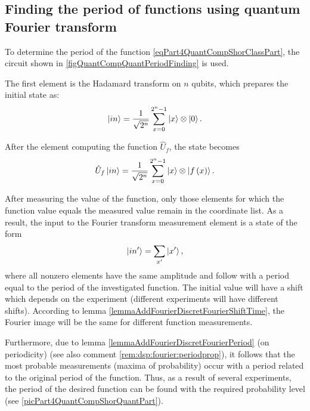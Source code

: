 \subsection{Finding the period of functions using quantum
  Fourier transform}

To determine the period of the function \eqref{eqPart4QuantCompShorClassPart},
the circuit shown in
\autoref{figQuantCompQuantPeriodFinding} is used.



The first element is the Hadamard transform on $n$ qubits,
which
prepares the initial state as:
\begin{equation}
\ket{in} = \frac{1}{\sqrt{2^n}}\sum_{x=0}^{2^n - 1} \ket{x}
\otimes\ket{0}.
\nonumber
\end{equation}

After the element computing the function $\hat{U}_f$, the state becomes
\begin{equation}
\hat{U}_f\ket{in} = \frac{1}{\sqrt{2^n}}\sum_{x=0}^{2^n - 1} \ket{x}
\otimes\left|f\left(x\right)\right>.
\nonumber
\end{equation} 



After measuring the value of the function, only those elements for which the function value equals the measured value remain in the coordinate list. As a result, the input to the Fourier transform measurement element is a state of the form 
\begin{equation}
\ket{in'} = \sum_{x'} \ket{x'},
\nonumber
\end{equation} 
where all nonzero elements have the same amplitude and follow with a period equal to the period of the investigated function. The initial value will have a shift which depends on the experiment (different experiments will have different shifts). According to lemma
\ref{lemmaAddFourierDiscretFourierShiftTime}, the Fourier image will be
the same for different function measurements.

Furthermore, due to lemma \ref{lemmaAddFourierDiscretFourierPeriod}
(on periodicity) (see also comment
\ref{rem:dsp:fourier:periodprop}), it follows that the most
probable measurements (maxima 
of probability) occur with a period related to the original period
of the function. Thus, as a result of several experiments, the period
of the desired function can be found with the required probability level
(see \autoref{picPart4QuantCompShorQuantPart}).

